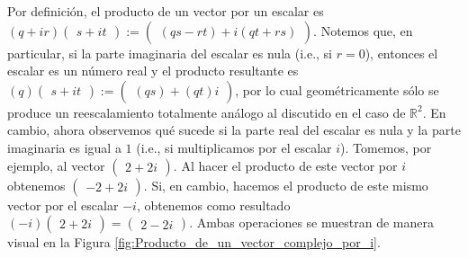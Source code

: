 \documentclass[apuntes]{subfiles}
\begin{document}
Por definición, el producto de un vector por un escalar es $(q+ir)\begin{pmatrix}s+it\end{pmatrix}:=\begin{pmatrix}(qs-rt)+i(qt+rs)\end{pmatrix}$. Notemos que, en particular, si la parte imaginaria del escalar es nula (i.e., si $r=0$), entonces el escalar es un número real y el producto resultante es $(q)\begin{pmatrix}s+it\end{pmatrix}:=\begin{pmatrix}(qs)+(qt)i\end{pmatrix}$, por lo cual geométricamente sólo se produce un reescalamiento totalmente análogo al discutido en el caso de $\mathbb{R}^2$. En cambio, ahora observemos qué sucede si la parte real del escalar es nula y la parte imaginaria es igual a $1$ (i.e., si multiplicamos por el escalar $i$). Tomemos, por ejemplo, al vector $\begin{pmatrix}2+2i\end{pmatrix}$. Al hacer el producto de este vector por $i$ obtenemos $\begin{pmatrix}-2+2i\end{pmatrix}$. Si, en cambio, hacemos el producto de este mismo vector por el escalar $-i$, obtenemos como resultado $(-i)\begin{pmatrix}2+2i\end{pmatrix}=\begin{pmatrix}2-2i\end{pmatrix}$. Ambas operaciones se muestran de manera visual en la Figura \ref{fig:Producto_de_un_vector_complejo_por_i}. \\
\end{document}
